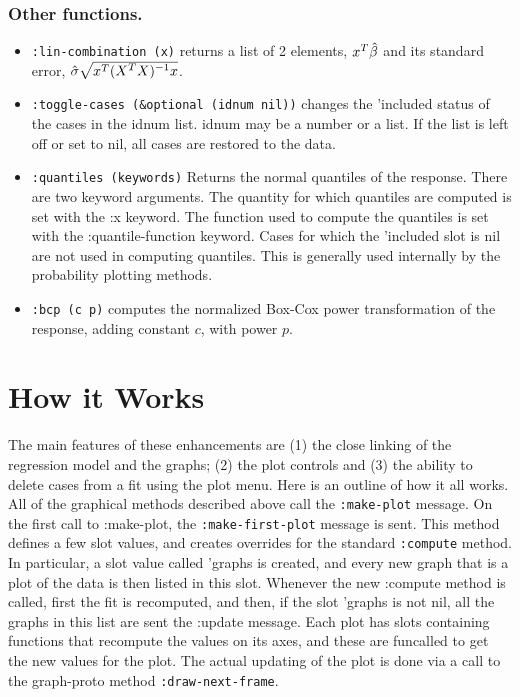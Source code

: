 \subsubsection {Other functions.}
\begin{itemize}
\item {\tt :lin-combination (x)} returns a list of 2 elements, $x^T\mbox{$\hat{\beta}$}$
and its standard error, $\mbox{$\hat{\sigma}$} \sqrt{x^T\mbox{$(X^{T}X)^{-1}$} x}$.
\item {\tt :toggle-cases (\&optional (idnum nil))}  changes the 
'included status of the cases in the idnum list.  
idnum may be a number or a list.  If the list is left off or set to nil, all
cases are restored to the data.
\item {\tt :quantiles (keywords)}  Returns the normal quantiles of the response.
There are two keyword arguments.  The quantity for which quantiles are
computed is set with the :x keyword.  The function used to compute the
quantiles is set with the :quantile-function keyword. 
Cases for which the 'included slot is nil are not used in computing
quantiles.  This is generally used internally by the probability plotting
methods.
\item {\tt :bcp (c p)} computes the normalized Box-Cox power 
transformation of the
response, adding constant $c$, with power $p$.
\end{itemize}

\section{How it Works}
The main features of these enhancements are (1) the close linking of the
regression model and the graphs; (2) the plot controls  
and (3) the ability to delete cases from a fit using
the plot menu.  Here is an outline of how it all works.  
All of the graphical methods described above call
the  {\tt :make-plot} message.  On the first call to :make-plot, the 
{\tt :make-first-plot} 
message is sent.  This method defines a few slot values, and
creates overrides for the standard {\tt :compute} method.  In particular, a slot
value called 'graphs is created, and every new graph that is a plot of the
data is then listed in
this slot.  Whenever the new :compute method is called, first the fit is
recomputed, and then, if the slot 'graphs is not nil, all the graphs in this
list are sent the :update message.  Each plot has slots containing functions
that recompute the values on its axes, and these are funcalled to get the new
values for the plot.  The actual updating of the plot is done via a call to
the graph-proto method {\tt :draw-next-frame}.  

